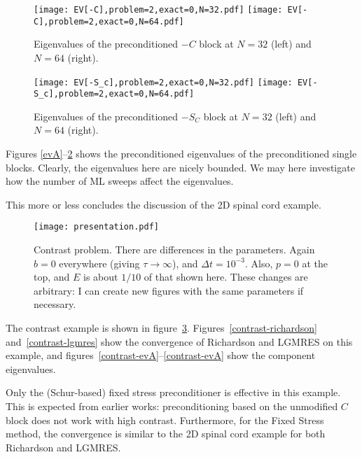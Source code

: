 \documentclass{article}
\begin{document}
\begin{figure}
\begin{center}
\texttt{[image: EV[-C],problem=2,exact=0,N=32.pdf]}
\texttt{[image: EV[-C],problem=2,exact=0,N=64.pdf]}
\caption{Eigenvalues of the preconditioned $-C$ block at $N=32$ (left) and $N=64$ (right).}
\label{evC}
\end{center}
\end{figure}


\begin{figure}
\begin{center}
\texttt{[image: EV[-S\_c],problem=2,exact=0,N=32.pdf]}
\texttt{[image: EV[-S\_c],problem=2,exact=0,N=64.pdf]}
\caption{Eigenvalues of the preconditioned $-S_C$ block at $N=32$ (left) and $N=64$ (right).}
\label{evS}
\end{center}
\end{figure}

Figures \ref{evA}--\ref{evS} shows the preconditioned eigenvalues of the
preconditioned single blocks. Clearly, the eigenvalues here are nicely
bounded. We may here investigate how the number of ML sweeps affect the
eigenvalues.

This more or less concludes the discussion of the 2D spinal cord example. 

\FloatBarrier

\begin{figure}
\begin{center}
\texttt{[image: presentation.pdf]}
\caption{Contrast problem. There are differences in the parameters. Again $b=0$ everywhere (giving $\tau\rightarrow\infty$), and $\Delta t=10^{-3}$. Also, $p=0$ at the top, and $E$ is about $1/10$ of that shown here. These changes are arbitrary: I can create new figures with the same parameters if necessary.}
\label{contrast}
\end{center}
\end{figure}

The contrast example is shown in figure~\ref{contrast}. Figures~\ref{contrast-richardson} and~\ref{contrast-lgmres} show the convergence of Richardson and LGMRES on this example, and figures~\ref{contrast-evA}--\ref{contrast-evA} show the component eigenvalues.

Only the (Schur-based) fixed stress preconditioner is effective in this example. This is expected from earlier works: preconditioning based on the unmodified $C$ block does not work with high contrast. Furthermore, for the Fixed Stress method, the convergence is similar to the 2D spinal cord example for both Richardson and LGMRES.
\end{document}
